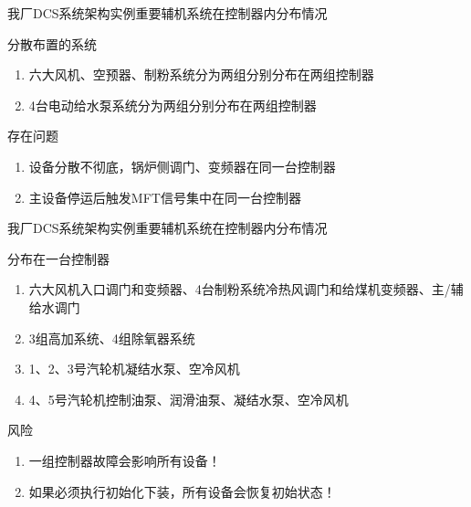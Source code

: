 \documentclass[12pt,hyperref={CJKbookmarks=true}]{beamer} %
\begin{document}
\begin{frame}{我厂DCS系统架构实例}{重要辅机系统在控制器内分布情况}
\begin{block}{\heiti 分散布置的系统}
			\begin{enumerate}

				\item  六大风机、空预器、制粉系统分为两组分别分布在两组控制器
				
				\item   4台电动给水泵系统分为两组分别分布在两组控制器
		\end{enumerate}
		\end{block}
\pause
\begin{alertblock}{\heiti 存在问题}
			\begin{enumerate}
				\item  设备分散不彻底，锅炉侧调门、变频器在同一台控制器
				
				\item  主设备停运后触发MFT信号集中在同一台控制器
		\end{enumerate}
		\end{alertblock}
\end{frame}

\begin{frame}{我厂DCS系统架构实例}{重要辅机系统在控制器内分布情况}
\begin{exampleblock}{\heiti 分布在一台控制器}
			\begin{enumerate}
				\item  六大风机入口调门和变频器、4台制粉系统冷热风调门和给煤机变频器、主/辅给水调门
				
				\item  3组高加系统、4组除氧器系统
				
				\item   1、2、3号汽轮机凝结水泵、空冷风机

				\item   4、5号汽轮机控制油泵、润滑油泵、凝结水泵、空冷风机
		\end{enumerate}
		\end{exampleblock}
\pause
\begin{alertblock}{\heiti 风险}
			\begin{enumerate}
				\item  一组控制器故障会影响所有设备！
\item  如果必须执行初始化下装，所有设备会恢复初始状态！
		\end{enumerate}
		\end{alertblock}
\end{frame}
\end{document}
